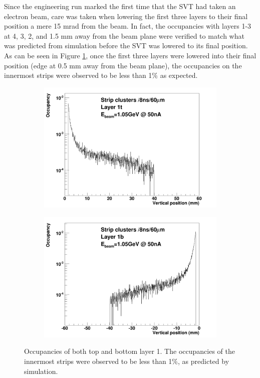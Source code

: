 Since the engineering run marked the first time that the SVT had taken an 
electron beam, care was taken when lowering the first three layers to their 
final position a mere 15 mrad from the beam.  In fact, the occupancies 
with layers 1-3 at 4, 3, 2, and 1.5 mm away from the beam plane were verified to
match what was predicted from simulation before the SVT was lowered to its final
position.  As can be seen in Figure \ref{fig:occupancies}, once the first
three layers were lowered into their final position (edge at 0.5 mm away from the
beam plane), the occupancies on the innermost strips were observed to be less
than 1\% as expected.
\begin{figure}[h!b]
    \begin{subfigure}{.5\textwidth}
        \centering
        \includegraphics[width=\textwidth]{images/cluster_occupancy_L1t_axial.png}
    \end{subfigure}
    \begin{subfigure}{.5\textwidth}
        \centering
        \includegraphics[width=\textwidth]{images/cluster_occupancy_L1b_axial.png}
    \end{subfigure}
    \caption{Occupancies of both top and bottom layer 1.  The occupancies of 
             the innermost strips were observed to be less than 1\%, as predicted
             by simulation.}
    \label{fig:occupancies}
\end{figure}  

